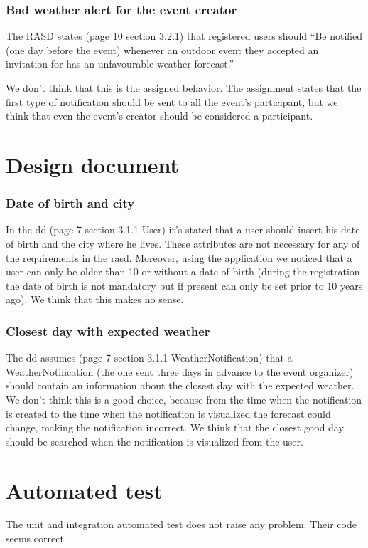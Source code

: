 \documentclass[10pt,a4paper,titlepage]{article}
\begin{document}
\section{Bad weather alert for the event creator}
The RASD states (page 10 section 3.2.1) that registered users should ``Be notified (one day before the event) whenever an outdoor event they accepted an invitation for has an unfavourable weather forecast.''

We don't think that this is the assigned behavior. The assignment states that the first type of notification should be sent to all the event's participant, but we think that even the event's creator should be considered a participant.

\pagebreak
\part{Design document}
\section{Date of birth and city}
In the dd (page 7 section 3.1.1-User) it's stated that a user should insert his date of birth and the city where he lives. These attributes are not necessary for any of the requirements in the rasd. Moreover, using the application we noticed that a user can only be older than 10 or without a date of birth (during the registration the date of birth is not mandatory but if present can only be set prior to 10 years ago). We think that this makes no sense.

\section{Closest day with expected weather}
The dd assumes (page 7 section 3.1.1-WeatherNotification) that a WeatherNotification (the one sent three days in advance to the event organizer) should contain an information about the closest day with the expected weather.
We don't think this is a good choice, because from the time when the notification is created to the time when the notification is visualized the forecast could change, making the notification incorrect. We think that the closest good day should be searched when the notification is visualized from the user.

\pagebreak
\part{Automated test}
The unit and integration automated test does not raise any problem. Their code seems correct.
\end{document}
